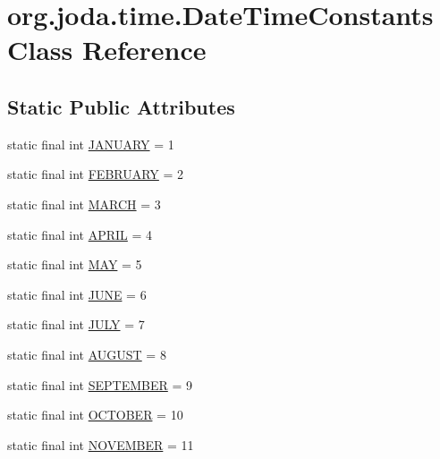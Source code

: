 \hypertarget{classorg_1_1joda_1_1time_1_1_date_time_constants}{\section{org.\-joda.\-time.\-Date\-Time\-Constants Class Reference}
\label{classorg_1_1joda_1_1time_1_1_date_time_constants}
}
\subsection*{Static Public Attributes}
\begin{DoxyCompactItemize}
\item 
static final int \hyperlink{classorg_1_1joda_1_1time_1_1_date_time_constants_aed09ce4951d640f18368cc4fbd042739}{J\-A\-N\-U\-A\-R\-Y} = 1
\item 
static final int \hyperlink{classorg_1_1joda_1_1time_1_1_date_time_constants_a8233cd8b18bbea7dafd5b400ededf12e}{F\-E\-B\-R\-U\-A\-R\-Y} = 2
\item 
static final int \hyperlink{classorg_1_1joda_1_1time_1_1_date_time_constants_a337c48dd830fd480ca1a9a1083c609d6}{M\-A\-R\-C\-H} = 3
\item 
static final int \hyperlink{classorg_1_1joda_1_1time_1_1_date_time_constants_a4555130791a0ff9072873f52dec2b5bd}{A\-P\-R\-I\-L} = 4
\item 
static final int \hyperlink{classorg_1_1joda_1_1time_1_1_date_time_constants_affcbb4ffc72ea1199b3b3ed3e9f4563d}{M\-A\-Y} = 5
\item 
static final int \hyperlink{classorg_1_1joda_1_1time_1_1_date_time_constants_a2f0cf58ff3f296af036ae1d51ee459d5}{J\-U\-N\-E} = 6
\item 
static final int \hyperlink{classorg_1_1joda_1_1time_1_1_date_time_constants_af7b25dfbec63e50659f9870c1e17f2e5}{J\-U\-L\-Y} = 7
\item 
static final int \hyperlink{classorg_1_1joda_1_1time_1_1_date_time_constants_ad1152eb2e30af65b9bc3fe947ed444e8}{A\-U\-G\-U\-S\-T} = 8
\item 
static final int \hyperlink{classorg_1_1joda_1_1time_1_1_date_time_constants_ae7a1485172a8c28d924b9c147a4ec514}{S\-E\-P\-T\-E\-M\-B\-E\-R} = 9
\item 
static final int \hyperlink{classorg_1_1joda_1_1time_1_1_date_time_constants_a68055b0f87102999dbd9ab9cb387958d}{O\-C\-T\-O\-B\-E\-R} = 10
\item 
static final int \hyperlink{classorg_1_1joda_1_1time_1_1_date_time_constants_a1309010fe57642c28d0e2648fce2bfdd}{N\-O\-V\-E\-M\-B\-E\-R} = 11

\end{DoxyCompactItemize}
